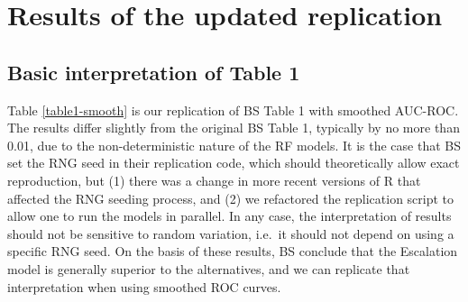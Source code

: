 \documentclass[]{article}
\begin{document}
\hypertarget{results-of-the-updated-replication}{%
\section{Results of the updated
replication}\label{results-of-the-updated-replication}}

\hypertarget{basic-interpretation-of-table-1}{%
\subsection{Basic interpretation of Table
1}\label{basic-interpretation-of-table-1}}

Table \ref{table1-smooth} is our replication of BS Table 1 with smoothed
AUC-ROC. The results differ slightly from the original BS Table 1,
typically by no more than 0.01, due to the non-deterministic nature of
the RF models. It is the case that BS set the RNG seed in their
replication code, which should theoretically allow exact reproduction,
but (1) there was a change in more recent versions of R that affected
the RNG seeding process, and (2) we refactored the replication script to
allow one to run the models in parallel. In any case, the interpretation
of results should not be sensitive to random variation, i.e.~it should
not depend on using a specific RNG seed. On the basis of these results,
BS conclude that the Escalation model is generally superior to the
alternatives, and we can replicate that interpretation when using
smoothed ROC curves.
\end{document}
